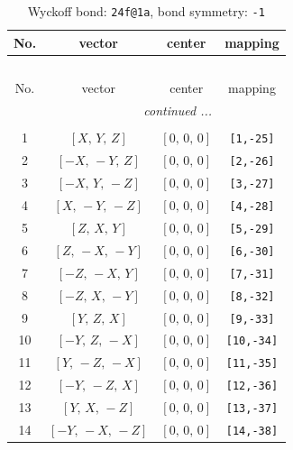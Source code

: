 \documentclass[fleqn,8pt]{jsarticle}
\begin{document}
\begin{longtable}{cccc}
\caption{Wyckoff bond: {\tt 24f@1a}, bond symmetry: {\tt -1}}
 \\
 \hline \hline
No. & vector & center & mapping \\ \hline \endfirsthead

\multicolumn{3}{l}{\tablename\ \thetable{}} \\
 \hline \hline
No. & vector & center & mapping \\ \hline \endhead

 \hline \hline
\multicolumn{3}{r}{\footnotesize\it continued ...} \\ \endfoot

 \hline \hline
\multicolumn{3}{r}{} \\ \endlastfoot

1 & $\left[ X,\, Y,\, Z \right]$ & $\left[ 0,\, 0,\, 0 \right]$ & {\tt [1,-25]} \\ \hline
2 & $\left[ - X,\, - Y,\, Z \right]$ & $\left[ 0,\, 0,\, 0 \right]$ & {\tt [2,-26]} \\ \hline
3 & $\left[ - X,\, Y,\, - Z \right]$ & $\left[ 0,\, 0,\, 0 \right]$ & {\tt [3,-27]} \\ \hline
4 & $\left[ X,\, - Y,\, - Z \right]$ & $\left[ 0,\, 0,\, 0 \right]$ & {\tt [4,-28]} \\ \hline
5 & $\left[ Z,\, X,\, Y \right]$ & $\left[ 0,\, 0,\, 0 \right]$ & {\tt [5,-29]} \\ \hline
6 & $\left[ Z,\, - X,\, - Y \right]$ & $\left[ 0,\, 0,\, 0 \right]$ & {\tt [6,-30]} \\ \hline
7 & $\left[ - Z,\, - X,\, Y \right]$ & $\left[ 0,\, 0,\, 0 \right]$ & {\tt [7,-31]} \\ \hline
8 & $\left[ - Z,\, X,\, - Y \right]$ & $\left[ 0,\, 0,\, 0 \right]$ & {\tt [8,-32]} \\ \hline
9 & $\left[ Y,\, Z,\, X \right]$ & $\left[ 0,\, 0,\, 0 \right]$ & {\tt [9,-33]} \\ \hline
10 & $\left[ - Y,\, Z,\, - X \right]$ & $\left[ 0,\, 0,\, 0 \right]$ & {\tt [10,-34]} \\ \hline
11 & $\left[ Y,\, - Z,\, - X \right]$ & $\left[ 0,\, 0,\, 0 \right]$ & {\tt [11,-35]} \\ \hline
12 & $\left[ - Y,\, - Z,\, X \right]$ & $\left[ 0,\, 0,\, 0 \right]$ & {\tt [12,-36]} \\ \hline
13 & $\left[ Y,\, X,\, - Z \right]$ & $\left[ 0,\, 0,\, 0 \right]$ & {\tt [13,-37]} \\ \hline
14 & $\left[ - Y,\, - X,\, - Z \right]$ & $\left[ 0,\, 0,\, 0 \right]$ & {\tt [14,-38]} \\ \hline

\end{longtable}
\end{document}
